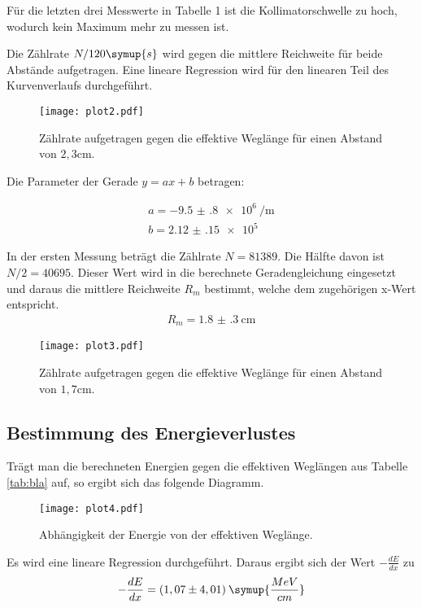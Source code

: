 Für die letzten drei Messwerte in Tabelle 1 ist die Kollimatorschwelle zu hoch, wodurch kein Maximum mehr zu messen ist.

Die Zählrate $N/120\symup{s}$ wird gegen die mittlere Reichweite für beide Abstände aufgetragen. Eine lineare Regression wird für den linearen Teil
des Kurvenverlaufs durchgeführt.

\begin{figure}[H]
  \centering
  \texttt{[image: plot2.pdf]}
  \caption{Zählrate aufgetragen gegen die effektive Weglänge für einen Abstand von $2,3$cm.}
  \label{fig:plot}
\end{figure}


Die Parameter der Gerade $y=ax + b$ betragen:

\begin{align*}
  a = \SI{-9.5(8)e6}{\per\meter} \\
  b = \SI{2.12(15)e5}{}
\end{align*}

In der ersten Messung beträgt die Zählrate $N =81389$. Die Hälfte davon ist $N/2 = 40695$. Dieser Wert wird in die berechnete Geradengleichung eingesetzt und
daraus die mittlere Reichweite $R_m$ bestimmt, welche dem zugehörigen x-Wert entspricht.
\begin{align*}
  R_m = \SI{1.8(3)}{\centi\meter}
\end{align*}


\begin{figure}[H]
  \centering
  \texttt{[image: plot3.pdf]}
  \caption{Zählrate aufgetragen gegen die effektive Weglänge für einen Abstand von $1,7$cm.}
  \label{fig:plot}
\end{figure}



\subsection{Bestimmung des Energieverlustes}
Trägt man die berechneten Energien gegen die effektiven Weglängen aus Tabelle \ref{tab:bla} auf,
so ergibt sich das folgende Diagramm.
\begin{figure}[H]
  \centering
  \texttt{[image: plot4.pdf]}
  \caption{Abhängigkeit der Energie von der effektiven Weglänge.}
  \label{fig:plot4}
\end{figure}
Es wird eine lineare Regression durchgeführt. Daraus ergibt sich der Wert $-\frac{dE}{dx}$ zu
\begin{equation*}
  -\frac{dE}{dx} = (1,07 \pm 4,01) \: \symup{\frac{MeV}{cm}}
\end{equation*}

